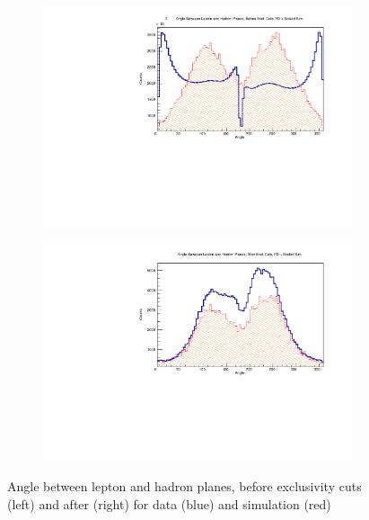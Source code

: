 \begin{figure}[!htb]
    \centering
    \begin{subfigure}{.45\textwidth}
        \centering
        \includegraphics[width=1\textwidth]{figures/Simulation/exclusivity/hist_lept_had_angle_prexcut_fd_Double.pdf}
    \end{subfigure}%
    \begin{subfigure}{.45\textwidth}
        \centering
        \includegraphics[width=1\textwidth]{figures/Simulation/exclusivity/hist_lept_had_angle_excut_fd_Double.pdf}
    \end{subfigure}
    \caption[short]{Angle between lepton and hadron planes, before exclusivity cuts (left) and after (right) for data (blue) and simulation (red)}
\end{figure}





